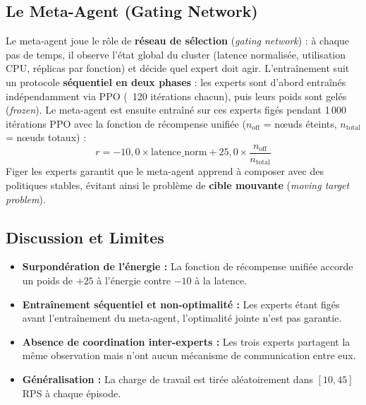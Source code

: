 \subsection{Le Meta-Agent (Gating Network)}

Le meta-agent joue le rôle de \textbf{réseau de sélection} (\textit{gating network}) : à chaque pas de temps, il observe l'état global du cluster (latence normalisée, utilisation CPU, réplicas par fonction) et décide quel expert doit agir. L'entraînement suit un protocole \textbf{séquentiel en deux phases} : les experts sont d'abord entraînés indépendamment via PPO (~120 itérations chacun), puis leurs poids sont gelés (\textit{frozen}). Le meta-agent est ensuite entraîné sur ces experts figés pendant 1\,000 itérations PPO avec la fonction de récompense unifiée ($n_{\text{off}}$ = nœuds éteints, $n_{\text{total}}$ = nœuds totaux) :
\[
r = -10{,}0 \times \text{latence\_norm} + 25{,}0 \times \frac{n_{\text{off}}}{n_{\text{total}}}
\]
Figer les experts garantit que le meta-agent apprend à composer avec des politiques stables, évitant ainsi le problème de \textbf{cible mouvante} (\textit{moving target problem}).

\subsection{Discussion et Limites}
\label{sec:discussion_limites}

\begin{itemize}
    \item \textbf{Surpondération de l'énergie :} La fonction de récompense unifiée accorde un poids de $+25$ à l'énergie contre $-10$ à la latence.
    \item \textbf{Entraînement séquentiel et non-optimalité :} Les experts étant figés avant l'entraînement du meta-agent, l'optimalité jointe n'est pas garantie.
    \item \textbf{Absence de coordination inter-experts :} Les trois experts partagent la même observation mais n'ont aucun mécanisme de communication entre eux.
    \item \textbf{Généralisation :} La charge de travail est tirée aléatoirement dans $[10, 45]$ RPS à chaque épisode.
\end{itemize}
